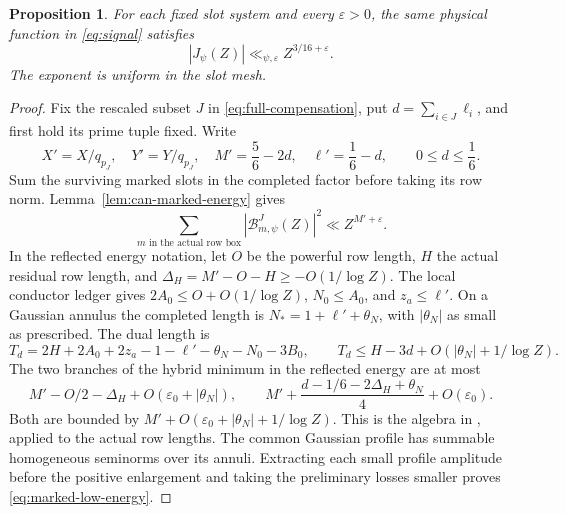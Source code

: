 \documentclass[11pt,a4paper]{article}
\numberwithin{equation}{section}
\newtheorem{proposition}[theorem]{Proposition}
\theoremstyle{definition}
\theoremstyle{remark}
\newcommand{\eps}{\varepsilon}
\begin{document}
\begin{proposition}\label{prop:physical-low}
For each fixed slot system and every $\eps>0$, the same physical function
in \eqref{eq:signal} satisfies
\begin{equation}\label{eq:all-low}
 |J_\psi(Z)|\ll_{\psi,\eps} Z^{3/16+\eps}.
\end{equation}
The exponent is uniform in the slot mesh.
\end{proposition}
\begin{proof}
Fix the rescaled subset $J$ in \eqref{eq:full-compensation}, put
$d=\sum_{i\in J}\ell_i$, and first hold its prime tuple fixed.  Write
\[
 X'=X/q_{p_J},\quad Y'=Y/q_{p_J},\quad
 M'=\frac56-2d,\quad\ell'=\frac16-d,\qquad0\leq d\leq\frac16.
\]
Sum the surviving marked slots in the completed factor before taking its
row norm.  Lemma~\ref{lem:can-marked-energy} gives
\begin{equation}\label{eq:marked-low-energy}
 \sum_{m\text{ in the actual row box}}
            |\mathcal B^J_{m,\psi}(Z)|^2\ll Z^{M'+\eps}.
\end{equation}
In the reflected energy notation, let $O$ be the powerful
row length, $H$ the actual residual row length, and
$\Delta_H=M'-O-H\geq-O(1/\log Z)$.  The local conductor ledger gives
$2A_0\leq O+O(1/\log Z)$, $N_0\leq A_0$, and $z_a\leq\ell'$.
On a Gaussian annulus the completed length is
$N_*=1+\ell'+\theta_N$, with $|\theta_N|$ as small as prescribed.
The dual length is
\[
 T_d=2H+2A_0+2z_a-1-\ell'-\theta_N-N_0-3B_0,
 \qquad T_d\leq H-3d+O(|\theta_N|+1/\log Z).
\]
The two branches of the hybrid minimum in the reflected energy are at most
\[
 M'-O/2-\Delta_H+O(\eps_0+|\theta_N|),\qquad
 M'+\frac{d-1/6-2\Delta_H+\theta_N}{4}+O(\eps_0).
\]
Both are bounded by $M'+O(\eps_0+|\theta_N|+1/\log Z)$.
This is the algebra in \cite[Lemma~15.1]{Q}, applied to the actual row
lengths.  The common Gaussian profile has summable homogeneous seminorms
over its annuli.  Extracting each small profile amplitude before the
positive enlargement and taking the preliminary losses smaller proves
\eqref{eq:marked-low-energy}.  


\end{proof}
\end{document}
